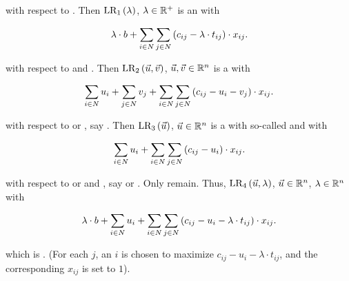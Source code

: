 \begin{optionenum}
 \item {} with respect to . Then $\fun{\mbox{LR}_1}{\lambda}$, $\lambda\in\RRR^+$ is an  with 
 
 \begin{equation}
 \lambda\cdot b+\sumdomain[i]{N}{\sumdomain[j]{N}{\brak{c_{ij}-\lambda\cdot t_{ij}}\cdot x_{ij}}}.
 \end{equation}

 \item {} with respect to  and . Then $\fun{\mbox{LR}_2}{\vec{u},\vec{v}}$, $\vec{u},\vec{v}\in\RRR^n$ is a  with 

 \begin{equation}
 \sumdomain[i]{N}{u_i}+\sumdomain[j]{N}{v_j}+\sumdomain[i]{N}{\sumdomain[j]{N}{\brak{c_{ij}-u_i-v_j}\cdot x_{ij}}}.
 \end{equation}

 \item {} with respect to  or , say . Then $\fun{\mbox{LR}_3}{\vec{u}}$, $\vec{u}\in\RRR^n$ is a  with so-called  and with 

 \begin{equation}
 \sumdomain[i]{N}{u_i}+\sumdomain[i]{N}{\sumdomain[j]{N}{\brak{c_{ij}-u_i}\cdot x_{ij}}}.
 \end{equation}

 \item {} with respect to  or  and , say  or . Only  remain. Thus, $\fun{\mbox{LR}_4}{\vec{u},\lambda}$, $\vec{u}\in\RRR^n$, $\lambda\in\RRR^n$ with 

 \begin{equation}
 \lambda\cdot b+\sumdomain[i]{N}{u_i}+\sumdomain[i]{N}{\sumdomain[j]{N}{\brak{c_{ij}-u_i-\lambda\cdot t_{ij}}\cdot x_{ij}}}.
 \end{equation}

which is . (For each $j$, an $i$ is chosen to maximize $c_{ij}-u_i-\lambda\cdot t_{ij}$, and the corresponding $x_{ij}$ is set to $1$).
\end{optionenum}

